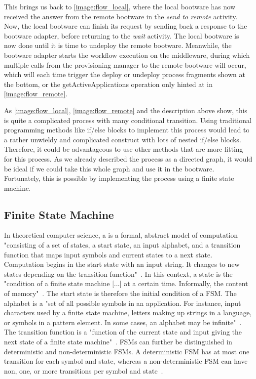 This brings us back to \autoref{image:flow_local}, where the local bootware has now received the answer from the remote bootware in the \textit{send to remote} activity.
Now, the local bootware can finish its request by sending back a response to the bootware adapter, before returning to the \textit{wait} activity.
The local bootware is now done until it is time to undeploy the remote bootware.
Meanwhile, the bootware adapter starts the workflow execution on the middleware, during which multiple calls from the provisioning manager to the remote bootware will occur, which will each time trigger the deploy or undeploy process fragments shown at the bottom, or the getActiveApplications operation only hinted at in \autoref{image:flow_remote}.

As \autoref{image:flow_local}, \autoref{image:flow_remote} and the description above show, this is quite a complicated process with many conditional transition.
Using traditional programming methods like if/else blocks to implement this process would lead to a rather unwieldy and complicated construct with lots of nested if/else blocks.
Therefore, it could be advantageous to use other methods that are more fitting for this process.
As we already described the process as a directed graph, it would be ideal if we could take this whole graph and use it in the bootware.
Fortunately, this is possible by implementing the process using a finite state machine.

\subsection{Finite State Machine}

In theoretical computer science, a  is a formal, abstract model of computation "consisting of a set of states, a start state, an input alphabet, and a transition function that maps input symbols and current states to a next state. Computation begins in the start state with an input string. It changes to new states depending on the transition function"~\autocite{fsm}.
In this context, a state is the "condition of a finite state machine [...] at a certain time. Informally, the content of memory"~\autocite{state}.
The start state is therefore the initial condition of a FSM.
The alphabet is a "set of all possible symbols in an application. For instance, input characters used by a finite state machine, letters making up strings in a language, or symbols in a pattern element. In some cases, an alphabet may be infinite"~\autocite{alphabet}.
The transition function is a "function of the current state and input giving the next state of a finite state machine"~\autocite{transitionfn}.
FSMs can further be distinguished in deterministic and non-deterministic FSMs.
A deterministic FSM has at most one transition for each symbol and state, whereas a non-deterministic FSM can have non, one, or more transitions per symbol and state~\autocite{deterministic}.

